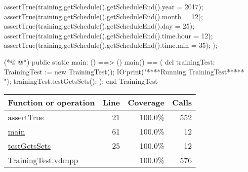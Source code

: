 \begin{vdmpp}[breaklines=true]
   assertTrue(training.getSchedule().getScheduleEnd().year = 2017);
   assertTrue(training.getSchedule().getScheduleEnd().month = 12);
   assertTrue(training.getSchedule().getScheduleEnd().day = 25);
   assertTrue(training.getSchedule().getScheduleEnd().time.hour = 12);
   assertTrue(training.getSchedule().getScheduleEnd().time.min = 35);
  );

(*@
\label{main:61}
@*)
 public static main: () ==> ()
   main() == (
    dcl trainingTest: TrainingTest := new TrainingTest();
    IO`print("\n *****Running TrainingTest***** \n");
    trainingTest.testGetsSets();
   );
end TrainingTest
\end{vdmpp}
\bigskip
\begin{longtable}{|l|r|r|r|}
\hline
Function or operation & Line & Coverage & Calls \\
\hline
\hline
\hyperref[assertTrue:21]{assertTrue} & 21&100.0\% & 552 \\
\hline
\hyperref[main:61]{main} & 61&100.0\% & 12 \\
\hline
\hyperref[testGetsSets:25]{testGetsSets} & 25&100.0\% & 12 \\
\hline
\hline
TrainingTest.vdmpp & & 100.0\% & 576 \\
\hline
\end{longtable}


